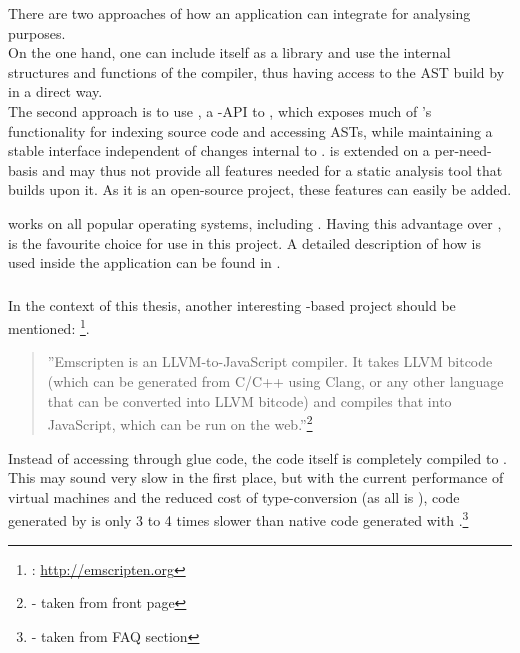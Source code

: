 There are two approaches of how an application can integrate  for analysing purposes.
\\On the one hand, one can include  itself as a library and use the internal structures and functions of the compiler, thus having access to the AST build by  in a direct way.
\\The second approach is to use , a -API to , which exposes much of 's functionality for indexing source code and accessing ASTs, while maintaining a stable interface independent of changes internal to .  is extended on a per-need-basis and may thus not provide all features needed for a static analysis tool that builds upon it. As it is an open-source project, these features can easily be added.

 works on all popular operating systems, including . Having this advantage over ,  is the favourite choice for use in this project. A detailed description of how  is used inside the application can be found in .

\subsubsection{}

In the context of this thesis, another interesting -based project should be mentioned: \footnote{: \url{http://emscripten.org}}. 

\begin{quotation}
''Emscripten is an LLVM-to-JavaScript compiler. It takes LLVM bitcode (which can be generated from C/C++ using Clang, or any other language that can be converted into LLVM bitcode) and compiles that into JavaScript, which can be run on the web.''\footnote{\citep{EmscriptenHP} - taken from front page}
\end{quotation}

Instead of accessing  through glue code, the  code itself is completely compiled to . This may sound very slow in the first place, but with the current performance of  virtual machines and the reduced cost of type-conversion (as all is ), code generated by  is only 3 to 4 times slower than native code generated with .\footnote{\citep{EmscriptenHP} - taken from FAQ section}